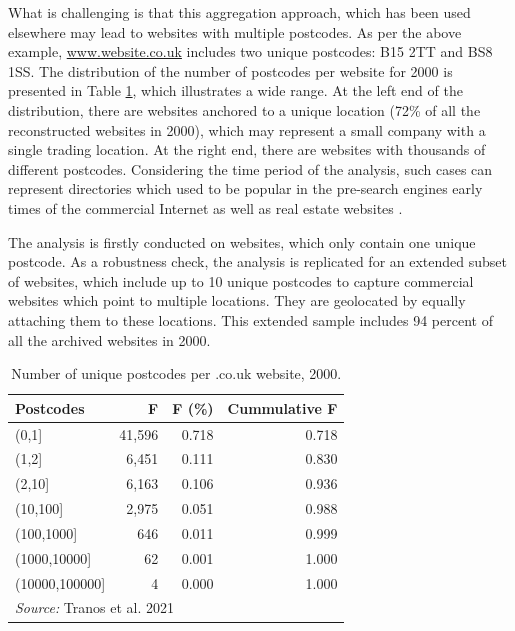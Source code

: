 \documentclass[
  authoryear,
  preprint,
  3p]{elsarticle}
\begin{document}
\noindent What is challenging is that this aggregation approach, which
has been used elsewhere \citep{tranosuk, shoreditch} may lead to
websites with multiple postcodes. As per the above example,
\href{http://www.website.co.uk}{www.website.co.uk} includes two unique
postcodes: B15 2TT and BS8 1SS. The distribution of the number of
postcodes per website for 2000 is presented in Table \ref{f2000}, which
illustrates a wide range. At the left end of the distribution, there are
websites anchored to a unique location (72\% of all the reconstructed
websites in 2000), which may represent a small company with a single
trading location. At the right end, there are websites with thousands of
different postcodes. Considering the time period of the analysis, such
cases can represent directories which used to be popular in the
pre-search engines early times of the commercial Internet as well as
real estate websites \citep{tranosuk}.

The analysis is firstly conducted on websites, which only contain one
unique postcode. As a robustness check, the analysis is replicated for
an extended subset of websites, which include up to 10 unique postcodes
to capture commercial websites which point to multiple locations. They
are geolocated by equally attaching them to these locations. This
extended sample includes 94 percent of all the archived websites in
2000.

\begin{table}

\caption{Number of unique postcodes per .co.uk website, 2000.\label{f2000}}
\centering
\begin{tabular}[t]{lrrr}
\toprule
Postcodes & F & F (\%) & Cummulative F\\
\midrule
(0,1] & 41,596 & 0.718 & 0.718\\
(1,2] & 6,451 & 0.111 & 0.830\\
(2,10] & 6,163 & 0.106 & 0.936\\
(10,100] & 2,975 & 0.051 & 0.988\\
(100,1000] & 646 & 0.011 & 0.999\\
\addlinespace
(1000,10000] & 62 & 0.001 & 1.000\\
(10000,100000] & 4 & 0.000 & 1.000\\
\bottomrule
\multicolumn{4}{l}{\rule{0pt}{1em}\textit{Source: } Tranos et al. 2021}\\
\end{tabular}
\end{table}
\end{document}
